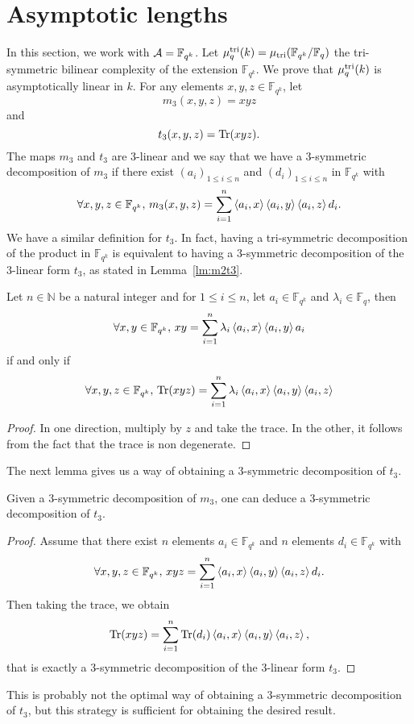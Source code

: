 \documentclass[a4paper,11pt]{article}
\begin{document}
\section{Asymptotic lengths}
\label{sec:asymptotic}
In this section, we work with $\mathcal{A}=\mathbb{F}_{q^k}$. Let
$\mu_{q}^{\text{tri}}(k)=\mu_{\text{tri}}(\mathbb{F}_{q^k}/\mathbb{F}_q)$ the tri-symmetric
bilinear complexity of the extension $\mathbb{F}_{q^k}$. We prove that
$\mu_{q}^{\text{tri}}(k)$ is asymptotically linear in $k$. For any elements $x, y, z\in\mathbb{F}_{q^k}$, let
\[
m_3(x, y, z) = xyz
\]
and
\[
t_3(x, y, z) = \operatorname{Tr}(xyz).
\]
The maps $m_3$ and $t_3$ are $3$-linear and we say that we have a $3$-symmetric
decomposition of $m_3$ if there exist $(a_i)_{1\leq i\leq n}$ and $(d_i)_{1\leq i\leq
n}$ in $\mathbb{F}_{q^k}$ with
\begin{equation}
    \forall x, y, z\in\mathbb{F}_{q^k},\,m_3(x, y, z) =
    \sum_{i=1}^n\left\langle a_i,x\right\rangle\left\langle a_i,y\right\rangle\left\langle a_i,z\right\rangle d_i.
  \label{eq:3-sym}
\end{equation}
We have a similar definition for $t_3$. In fact, having a tri-symmetric
decomposition of the product in $\mathbb{F}_{q^k}$ is equivalent to having a
$3$-symmetric decomposition of the $3$-linear form $t_3$, as stated in Lemma~\ref{lm:m2t3}.
\begin{lm}
  \label{lm:m2t3}
  Let $n\in\mathbb{N}$ be a natural integer and for $1\leq i \leq n$, let
  $a_i\in\mathbb{F}_{q^k}$ and $\lambda_i\in\mathbb{F}_q$, then
  \[
    \forall x, y\in\mathbb{F}_{q^k},\, xy =
    \sum_{i=1}^n\lambda_i\left\langle a_i,x\right\rangle\left\langle a_i,y\right\rangle a_i
  \]
  if and only if
  \[
    \forall x, y, z\in\mathbb{F}_{q^k},\,\operatorname{Tr}(xyz) =
    \sum_{i=1}^n\lambda_i\left\langle a_i,x\right\rangle\left\langle a_i,y\right\rangle\left\langle a_i,z\right\rangle
  \]
\end{lm}
\begin{proof}
  In one direction, multiply by $z$ and take the trace. In the other, it follows
  from the fact that the trace is non degenerate.
\end{proof}
The next lemma gives us a way of obtaining a $3$-symmetric decomposition of
$t_3$.
\begin{lm}
  Given a $3$-symmetric decomposition of $m_3$, one can deduce a $3$-symmetric
  decomposition of $t_3$.
\end{lm}
\begin{proof}
  Assume that there exist $n$ elements $a_i\in\mathbb{F}_{q^k}$ and $n$ elements
  $d_i\in\mathbb{F}_{q^k}$ with
  \[
    \forall x, y, z\in\mathbb{F}_{q^k},\,xyz =
    \sum_{i=1}^n\left\langle a_i,x\right\rangle\left\langle a_i,y\right\rangle\left\langle a_i,z\right\rangle d_i.
  \]
  Then taking the trace, we obtain
  \[
    \operatorname{Tr}(xyz) = \sum_{i=1}^n\operatorname{Tr}(d_i)\left\langle a_i,x\right\rangle\left\langle a_i,y\right\rangle\left\langle a_i,z\right\rangle,
  \]
  that is exactly a $3$-symmetric decomposition of the $3$-linear form $t_3$.
\end{proof}
\begin{rem}
  This is probably not the optimal way of obtaining a
  $3$-symmetric decomposition of $t_3$, but this strategy is sufficient for
  obtaining the desired result.
\end{rem}
\end{document}
